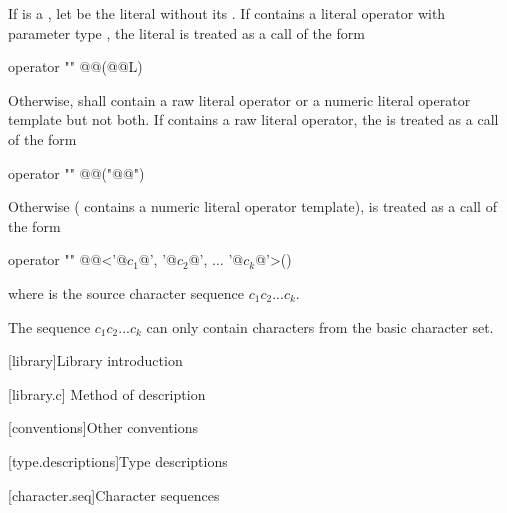 \documentclass{wg21}
\begin{document}
\pnum
If  is a , let  be the
literal without its . If  contains a literal operator
with parameter type , the literal  is treated as a call of
the form
\begin{codeblock}
    operator "" @@(@@L)
\end{codeblock}
Otherwise,  shall contain a raw literal operator
or a numeric literal operator template but not both.
If  contains a raw literal operator,
the   is treated as a call of the form
\begin{codeblock}
    operator "" @@("@@")
\end{codeblock}
Otherwise ( contains a numeric literal operator template),
 is treated as a call of the form
\begin{codeblock}
    operator "" @@<'@$c_1$@', '@$c_2$@', ... '@$c_k$@'>()
\end{codeblock}
where  is the source character sequence $c_1c_2...c_k$.
\begin{note}
    The sequence
    $c_1c_2...c_k$ can only contain characters from the basic  character set.
\end{note}


[library]{Library introduction}

[library.c]{ Method of description}

[conventions]{Other conventions}

[type.descriptions]{Type descriptions}

[character.seq]{Character sequences}
\end{document}

